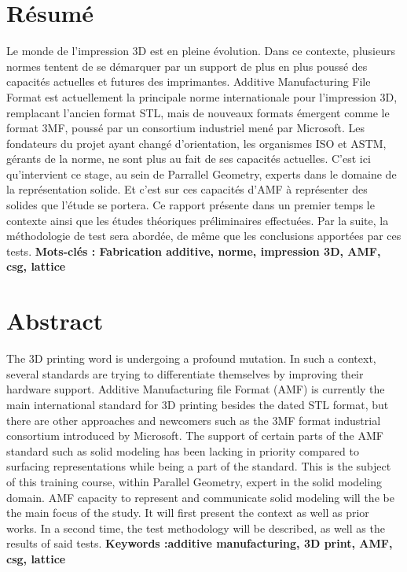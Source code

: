 \documentclass{tnreport}
\begin{document}
\cleardoublepage

\listoffigures
\cleardoublepage

\lstlistoflistings
\cleardoublepage

\section*{Résumé}
Le monde de l'impression 3D est en pleine évolution. Dans ce contexte, plusieurs normes tentent de se démarquer par un support de plus en plus poussé des capacités actuelles et futures des imprimantes. Additive Manufacturing File Format est actuellement la principale norme internationale pour l'impression 3D, remplacant l'ancien format STL, mais de nouveaux formats émergent comme le format 3MF, poussé par un consortium industriel mené par Microsoft. Les fondateurs du projet ayant changé d'orientation, les organismes ISO et ASTM, gérants de la norme, ne sont plus au fait de ses capacités actuelles. C'est ici qu'intervient ce stage, au sein de Parrallel Geometry, experts dans le domaine de la représentation solide. Et c'est sur ces capacités d'AMF à représenter des solides que l'étude se portera. Ce rapport présente dans un premier temps le contexte ainsi que les études théoriques préliminaires effectuées. Par la suite, la méthodologie de test sera abordée, de même que les conclusions apportées par ces tests.
{\bf Mots-clés : Fabrication additive, norme, impression 3D, AMF, csg, lattice}

\section*{Abstract}
The 3D printing word is undergoing a profound mutation. In such a context, several standards are trying to differentiate themselves by improving their hardware support. Additive Manufacturing file Format (AMF) is currently the main international standard for 3D printing besides the dated STL format, but there are other approaches and newcomers such as the 3MF format industrial consortium introduced by Microsoft. The support of certain parts of the AMF standard such as solid modeling has been lacking in priority compared to surfacing representations while being a part of the standard. This is the subject of this training course, within Parallel Geometry, expert in the solid modeling domain. AMF capacity to represent and communicate solid modeling will the be the main focus of the study. It will first present the context as well as prior works. In a second time, the test methodology will be described, as well as the results of said tests.
{\bf Keywords :additive manufacturing, 3D print, AMF, csg, lattice}
\end{document}
